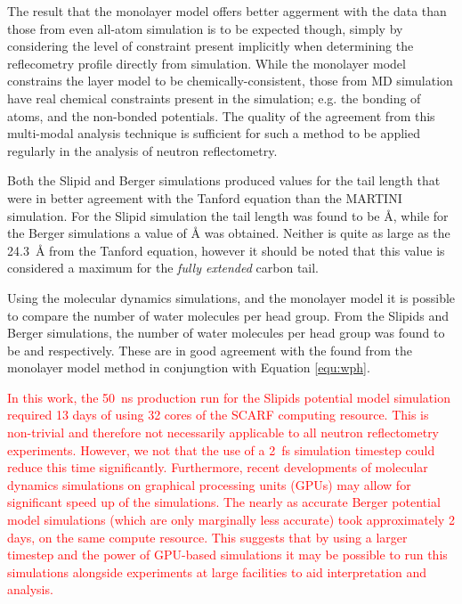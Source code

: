\documentclass[amsmath,amssymb,twocolumn,superscriptaddress]{revtex4-1}
\begin{document}
The result that the monolayer model offers better aggerment with the data than
those from even all-atom simulation is to be expected though, simply by
considering the level of constraint present implicitly when determining the
reflecometry profile directly from simulation.
While the monolayer model constrains the layer model to be
chemically-consistent, those from MD simulation have real chemical
constraints present in the simulation; e.g. the bonding of atoms, and
the non-bonded potentials.
The quality of the agreement from this multi-modal analysis technique
is sufficient for such a method to be applied regularly in the analysis
of neutron reflectometry.

Both the Slipid and Berger simulations produced values for the tail length
that were in better agreement with the Tanford equation than the
MARTINI simulation.
For the Slipid simulation the tail length was found to be
\si{\angstrom}, while for the
Berger simulations a value of
\si{\angstrom} was obtained.
Neither is quite as large as the \SI{24.3}{\angstrom} from the Tanford
equation, however it should be noted that this value is considered a
maximum for the \emph{fully extended} carbon tail.

Using the molecular dynamics simulations, and the monolayer model it is
possible to compare the number of water molecules per head group.
From the Slipids and Berger simulations, the number of water molecules per
head group was found to be 
and  respectively.
These are in good agreement with the
 found from the monolayer model
method in conjungtion with Equation \ref{equ:wph}.

\textcolor{red}{In this work, the \SI{50}{\nano\second} production run for the Slipids
potential model simulation required 13 days of using 32 cores of the SCARF
computing resource.
This is non-trivial and therefore not necessarily applicable to all neutron
reflectometry experiments.
However, we not that the use of a \SI{2}{\femto\second} simulation timestep
could reduce this time significantly.
Furthermore, recent developments of molecular dynamics simulations on
graphical processing units (GPUs) may allow for significant speed up of the
simulations.
The nearly as accurate Berger potential model simulations (which are only
marginally less accurate) took approximately 2 days, on the same compute
resource.
This suggests that by using a larger timestep and the power of GPU-based
simulations it may be possible to run this simulations alongside experiments
at large facilities to aid interpretation and analysis.}
\end{document}
